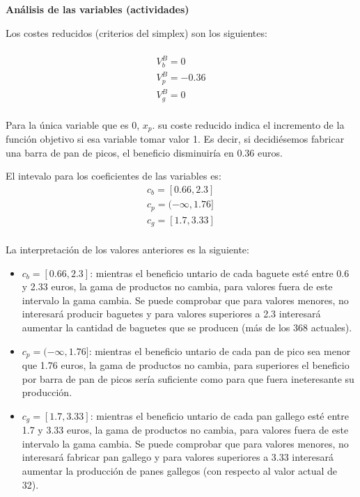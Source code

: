 \textbf{Análisis de las variables (actividades)}

Los costes reducidos (criterios del simplex) son los siguientes:
\\
\\
\begin{equation}
\begin{split}
    V^B_b = 0\\
    V^B_p = -0.36\\
    V^B_g = 0\\
\end{split}    
\end{equation}

Para la única variable que es 0, $x_p$. su coste reducido indica el incremento de la función objetivo si esa variable tomar valor 1. Es decir, si decidiésemos fabricar una barra de pan de picos, el beneficio disminuiría en 0.36 euros.

El intevalo para los coeficientes de las variables es: 
\begin{equation}
\begin{split}
    c_b = [0.66, 2.3]\\
    c_p = (-\infty, 1.76]\\
    c_g = [1.7, 3.33]\\
\end{split}    
\end{equation}

La interpretación de los valores anteriores es la siguiente:
\begin{itemize}
    \item $c_b = [0.66, 2.3]$: mientras el beneficio untario de cada baguete esté entre 0.6 y 2.33 euros, la gama de productos no cambia, para valores fuera de este intervalo la gama cambia. Se puede comprobar que para valores menores, no interesará producir baguetes y para valores superiores a 2.3 interesará aumentar la cantidad de baguetes que se producen (más de los 368 actuales).
    \item $c_p = (-\infty, 1.76]$: mientras el beneficio untario de cada pan de pico sea menor que 1.76 euros, la gama de productos no cambia, para superiores el beneficio por barra de pan de picos sería suficiente como para que fuera ineteresante su producción. 
    \item $c_g = [1.7, 3.33]$: mientras el beneficio untario de cada pan gallego esté entre 1.7 y 3.33 euros, la gama de productos no cambia, para valores fuera de este intervalo la gama cambia. Se puede comprobar que para valores menores, no interesará fabricar pan gallego y para valores superiores a 3.33 interesará aumentar la producción de panes gallegos (con respecto al valor actual de 32).
\end{itemize}



